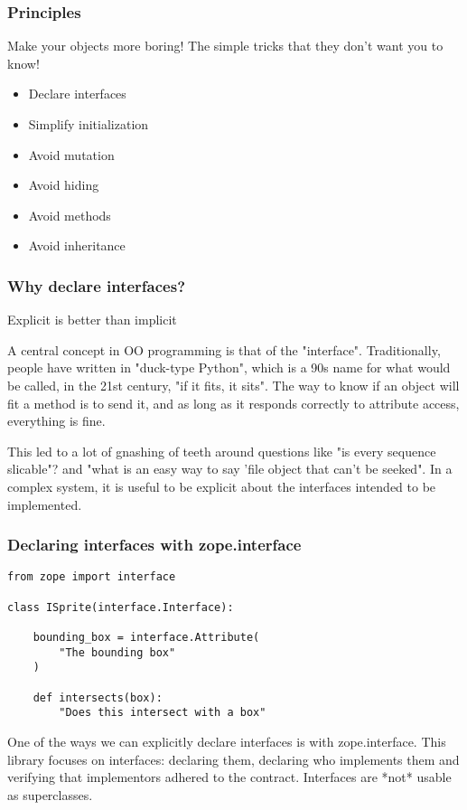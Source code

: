 \begin{frame}[fragile]
\frametitle{Principles}

Make your objects more boring!
The simple tricks that they don't want you to know!

\begin{itemize}
\item Declare interfaces\pause 
\item Simplify initialization\pause
\item Avoid mutation\pause
\item Avoid hiding\pause
\item Avoid methods
\item Avoid inheritance
\end{itemize}

\end{frame}

\begin{frame}[fragile]
\frametitle{Why declare interfaces?}

Explicit is better than implicit
\end{frame}

A central concept in OO programming is that of the "interface".
Traditionally,
people have written in "duck-type Python",
which is a 90s name for what would be called,
in the 21st century,
"if it fits, it sits".
The way to know if an object will fit a method is to send it,
and as long as it responds correctly to attribute access,
everything is fine.

This led to a lot of gnashing of teeth around questions like
"is every sequence slicable"?
and
"what is an easy way to say 'file object that can't be seeked".
In a complex system,
it is useful to be explicit about the interfaces intended to be
implemented.

\begin{frame}[fragile]
\frametitle{Declaring interfaces with zope.interface}

\begin{lstlisting}
from zope import interface

class ISprite(interface.Interface):

    bounding_box = interface.Attribute(
        "The bounding box"
    )

    def intersects(box):
        "Does this intersect with a box"
\end{lstlisting}

\end{frame}

One of the ways we can explicitly declare interfaces is with
zope.interface.
This library focuses on interfaces:
declaring them,
declaring who implements them
and verifying that implementors adhered to the contract.
Interfaces are
*not*
usable as superclasses.

